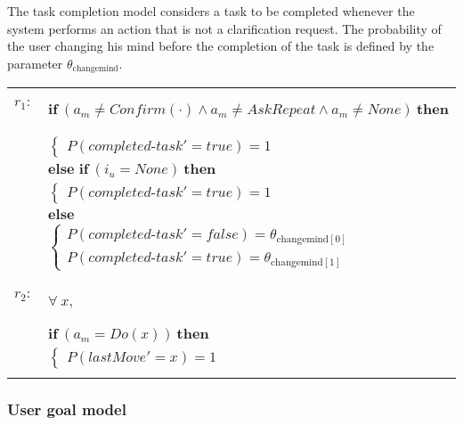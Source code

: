 The task completion model considers a task to be completed whenever the system performs an action that is not a clarification request. The probability of the user changing his mind before the completion of the task is defined by the parameter $\theta_{\mathrm{changemind}}$. 

\begin{footnotesize}
\begin{longtable}{p{2cm}l}
$r_{1}$: \ \ & $ \textbf{if} \ (\mathit{a_m}\!\neq\!\mathit{Confirm(\cdot)} \land \mathit{a_m}\!\neq\!\mathit{AskRepeat} \land \mathit{a_m}\!\neq\!\mathit{None}) \ \textbf{then} $ \\
 & \;\;\;\;\; $ \begin{cases}P(\mathit{completed\mbox{-}task}'\!=\!\mathit{true})\!=\!1 \end{cases}$ \vspace{1mm} \\ & $ \textbf{else if} \ (\mathit{i_u}\!=\!\mathit{None}) \ \textbf{then}$ \\
& \;\;\;\;\; $ \begin{cases}P(\mathit{completed\mbox{-}task}'\!=\!\mathit{true})\!=\!1 \end{cases}$ \vspace{1mm} \\ & $ \textbf{else}$ \\
& \;\;\;\;\; $ \begin{cases}P(\mathit{completed\mbox{-}task}'\!=\!\mathit{false})\!=\!\theta_{\mathrm{changemind[0]}} \\
P(\mathit{completed\mbox{-}task}'\!=\!\mathit{true})\!=\!\theta_{\mathrm{changemind[1]}} \end{cases}$ \\ \\[-1mm]
$r_{2}$: \ \ & $ \forall \ x, $ \\ & $ \textbf{if} \ (\mathit{a_m}\!=\!\mathit{Do(x)}) \ \textbf{then} $ \\
 & \;\;\;\;\; $ \begin{cases}P(\mathit{lastMove}'\!=\!\mathit{x})\!=\!1 \end{cases}$ \\ \\[-1mm]
\end{longtable}
\end{footnotesize}

\subsubsection*{User goal model}


